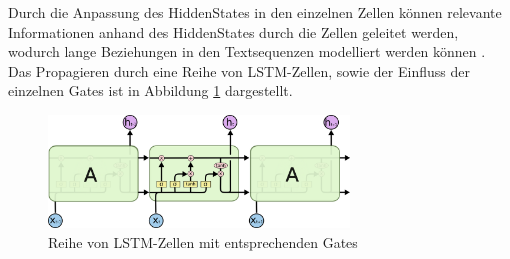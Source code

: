 Durch die Anpassung des HiddenStates in den einzelnen Zellen können relevante Informationen anhand des HiddenStates durch die Zellen geleitet werden, wodurch lange Beziehungen in den Textsequenzen modelliert werden können \citep{lstmexplained}.
Das Propagieren durch eine Reihe von LSTM-Zellen, sowie der Einfluss der einzelnen Gates ist in Abbildung \ref{lstm_chain} dargestellt.


\begin{figure}[h]
    \label{lstm_chain}
    \centering
    \includegraphics[width=8cm]{bilder/LSTM3-chain}
    \caption{Reihe von LSTM-Zellen mit entsprechenden Gates \citep{lstmexplained}}
\end{figure}

\pagebreak
